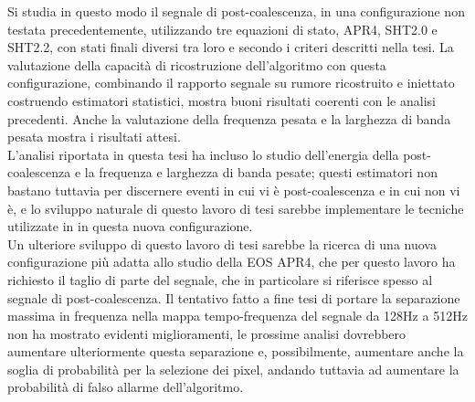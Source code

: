 Si studia in questo modo il segnale di post-coalescenza, in una configurazione non testata precedentemente, utilizzando tre equazioni di stato, APR4, SHT2.0 e SHT2.2, con stati finali diversi tra loro e secondo i criteri descritti nella tesi. 
La valutazione della capacità di ricostruzione dell'algoritmo con questa configurazione, combinando il rapporto segnale su rumore ricostruito e iniettato costruendo estimatori statistici, mostra buoni risultati coerenti con le analisi precedenti. Anche la valutazione della frequenza pesata e la larghezza di banda pesata mostra i risultati attesi. \\
L'analisi riportata in questa tesi ha incluso lo studio dell'energia della post-coalescenza e la frequenza e larghezza di banda pesate; questi estimatori non bastano tuttavia per discernere eventi in cui vi è post-coalescenza e in cui non vi è, e lo sviluppo naturale di questo lavoro di tesi sarebbe implementare le tecniche utilizzate in \cite{Puecher_2018} in questa nuova configurazione.\\
Un ulteriore sviluppo di questo lavoro di tesi sarebbe la ricerca di una nuova configurazione più adatta allo studio della EOS APR4, che per questo lavoro ha richiesto il taglio di parte del segnale, che in particolare si riferisce spesso al segnale di post-coalescenza. Il tentativo fatto a fine tesi di portare la separazione massima in frequenza nella mappa tempo-frequenza del segnale da 128Hz a 512Hz non ha mostrato evidenti miglioramenti, le prossime analisi dovrebbero aumentare ulteriormente questa separazione e, possibilmente, aumentare anche la soglia di probabilità per la selezione dei pixel, andando tuttavia ad aumentare la probabilità di falso allarme dell'algoritmo.



